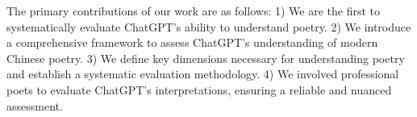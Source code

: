\documentclass[11pt]{article}
\begin{document}





The primary contributions of our work are as follows: 1)  We are the first to systematically evaluate ChatGPT's ability to understand poetry. 2) We introduce a comprehensive framework to assess ChatGPT's understanding of modern Chinese poetry. 3) We define key dimensions necessary for understanding poetry and establish a systematic evaluation methodology. 4) We involved professional poets to evaluate ChatGPT's interpretations, ensuring a reliable and nuanced assessment.







\end{document}
